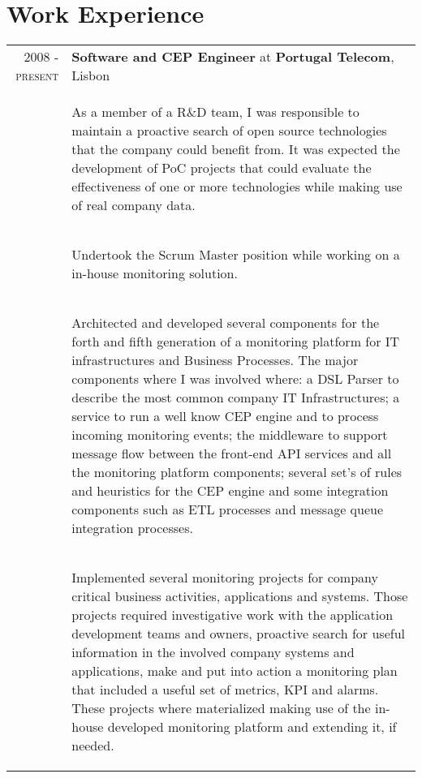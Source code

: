 \documentclass[a4paper,10pt]{article}
\begin{document}
\section{Work Experience}
\begin{tabular}{rp{11cm}}
  \textsc{2008 - present} & \textbf{Software and CEP Engineer} at \textbf{Portugal Telecom}, Lisbon\\ 
  & \begin{compactitem} 
     \item As a member of a R\&D team, I was responsible to maintain a proactive search of open source technologies that the company could benefit from. It was expected the development of PoC projects that could evaluate the effectiveness of one or more technologies while making use of real company data. 
     \end{compactitem}\vspace{-1em} \\
  & \begin{compactitem} 
     \item Undertook the Scrum Master position while working on a in-house monitoring solution.
     \end{compactitem}\vspace{-1em} \\
  & \begin{compactitem}
     \item Architected and developed several components for the forth and fifth generation of a monitoring platform for IT infrastructures and Business Processes. The major components where I was involved where: a DSL Parser to describe the most common company IT Infrastructures; a service to run a well know CEP engine and to process incoming monitoring events; the middleware to support message flow between the front-end API services and all the monitoring platform components; several set's of rules and heuristics for the CEP engine and some integration components such as ETL processes and message queue integration processes.
     \end{compactitem}\vspace{-1em} \\
  & \begin{compactitem} 
     \item Implemented several monitoring projects for company critical business activities, applications and systems. Those projects required investigative work with the application development teams and owners, proactive search for useful information in the involved company systems and applications, make and put into action a monitoring plan that included a useful set of metrics, KPI and alarms. These projects where materialized making use of the in-house developed monitoring platform and extending it, if needed.

\end{compactitem}
\end{tabular}
\end{document}
